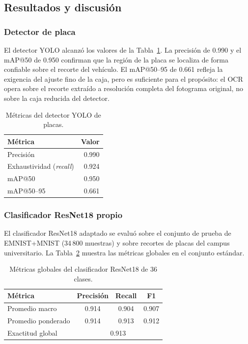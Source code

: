 \documentclass[11pt]{article}
\begin{document}
\subsection{Resultados y discusión}

\subsubsection{Detector de placa}

El detector YOLO alcanzó los valores de la Tabla~\ref{tab:det}. La precisión de 0.990
y el mAP@50 de 0.950 confirman que la región de la placa se localiza de forma confiable
sobre el recorte del vehículo. El mAP@50--95 de 0.661 refleja la exigencia del ajuste
fino de la caja, pero es suficiente para el propósito: el OCR opera sobre el recorte
extraído a resolución completa del fotograma original, no sobre la caja reducida del
detector.

\begin{table}[H]
    \centering
    \caption{Métricas del detector YOLO de placas.}
    \label{tab:det}
    \begin{tabular}{lr}
        \toprule
        \textbf{Métrica} & \textbf{Valor} \\
        \midrule
        Precisión                     & 0.990 \\
        Exhaustividad (\emph{recall}) & 0.924 \\
        mAP@50                        & 0.950 \\
        mAP@50--95                    & 0.661 \\
        \bottomrule
    \end{tabular}
\end{table}

\subsubsection{Clasificador ResNet18 propio}

El clasificador ResNet18 adaptado se evaluó sobre el conjunto de prueba de
EMNIST+MNIST (34\,800 muestras) y sobre recortes de placas del campus universitario.
La Tabla~\ref{tab:cnn} muestra las métricas globales en el conjunto estándar.

\begin{table}[H]
    \centering
    \caption{Métricas globales del clasificador ResNet18 de 36 clases.}
    \label{tab:cnn}
    \begin{tabular}{lccc}
        \toprule
        \textbf{Métrica} & \textbf{Precisión} & \textbf{Recall} & \textbf{F1} \\
        \midrule
        Promedio macro     & 0.914 & 0.904 & 0.907 \\
        Promedio ponderado & 0.914 & 0.913 & 0.912 \\
        Exactitud global   & \multicolumn{3}{c}{0.913} \\
        \bottomrule
    \end{tabular}
\end{table}
\end{document}
